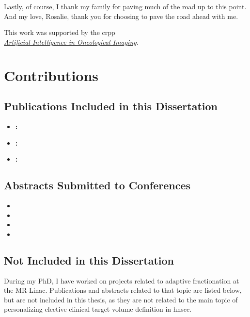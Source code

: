 \documentclass[\relativeRoot/main.tex]{subfiles}
\begin{document}
Lastly, of course, I thank my family for paving much of the road up to this point.\\
And my love, Rosalie, thank you for choosing to pave the road ahead with me.

\vspace{4cm}

This work was supported by the \gls{crpp}\\\href{https://www.crpp-ai-oncology.uzh.ch/en.html}{\emph{Artificial Intelligence in Oncological Imaging}}.

\chapter*{Contributions}
\section*{Publications Included in this Dissertation}
\begin{itemize}
    \item \textbf{:} 
    \item \textbf{:} 
    \item \textbf{:} 
\end{itemize}

\section*{Abstracts Submitted to Conferences}
\begin{itemize}
    \item {}
    \item {}
    \item {}
    \item {}
\end{itemize}

\section*{Not Included in this Dissertation}

During my PhD, I have worked on projects related to adaptive fractionation at the MR-Linac. Publications and abstracts related to that topic are listed below, but are not included in this thesis, as they are not related to the main topic of personalizing elective clinical target volume definition in \gls{hnscc}.
\end{document}

